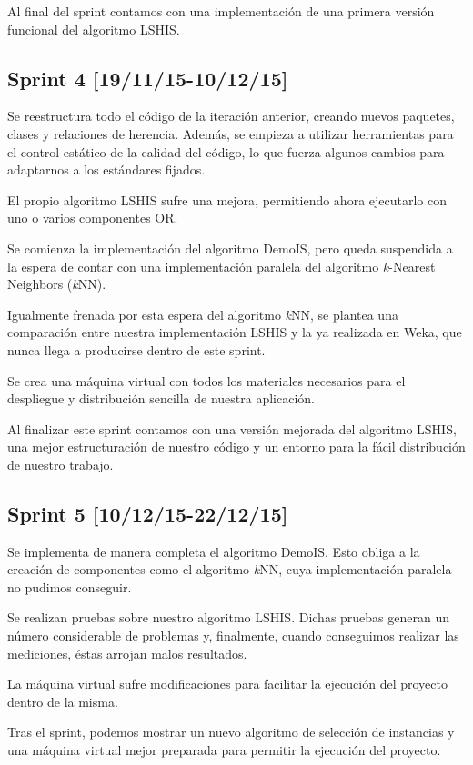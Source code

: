 Al final del sprint contamos con una implementación de una primera versión funcional del algoritmo LSHIS.

\subsection{Sprint 4 [19/11/15-10/12/15]}

Se reestructura todo el código de la iteración anterior, creando nuevos paquetes, clases y relaciones de herencia. Además, se empieza a utilizar herramientas para el control estático de la calidad del código, lo que fuerza algunos cambios para adaptarnos a los estándares fijados.

El propio algoritmo LSHIS sufre una mejora, permitiendo ahora ejecutarlo con uno o varios componentes OR.

Se comienza la implementación del algoritmo DemoIS, pero queda suspendida a la espera de contar con una implementación paralela del algoritmo \textit{k}-Nearest Neighbors (\textit{k}NN).

Igualmente frenada por esta espera del algoritmo \textit{k}NN, se plantea una comparación entre nuestra implementación LSHIS y la ya realizada en Weka, que nunca llega a producirse dentro de este sprint.

Se crea una máquina virtual con todos los materiales necesarios para el despliegue y distribución sencilla de nuestra aplicación.

Al finalizar este sprint contamos con una versión mejorada del algoritmo LSHIS, una mejor estructuración de nuestro código y un entorno para la fácil distribución de nuestro trabajo.

\subsection{Sprint 5 [10/12/15-22/12/15]}

Se implementa de manera completa el algoritmo DemoIS. Esto obliga a la creación de  componentes como el algoritmo \textit{k}NN, cuya implementación paralela no pudimos conseguir.

Se realizan pruebas sobre nuestro algoritmo LSHIS. Dichas pruebas generan un número considerable de problemas y, finalmente, cuando conseguimos realizar las mediciones, éstas arrojan malos resultados.

La máquina virtual sufre modificaciones para facilitar la ejecución del proyecto dentro de la misma.

Tras el sprint, podemos mostrar un nuevo algoritmo de selección de instancias y una máquina virtual mejor preparada para permitir la ejecución del proyecto.

